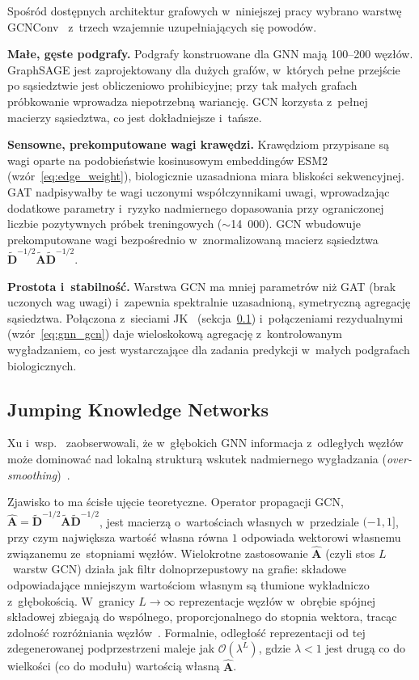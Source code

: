 \documentclass{SGGW-thesis}
\begin{document}
Spośród dostępnych architektur grafowych w~niniejszej pracy wybrano warstwę GCNConv~\cite{kipf2017}
z~trzech wzajemnie uzupełniających się powodów.

\textbf{Małe, gęste podgrafy.} Podgrafy konstruowane dla GNN mają 100--200 węzłów. GraphSAGE
jest zaprojektowany dla dużych grafów, w~których pełne przejście po sąsiedztwie jest
obliczeniowo prohibicyjne; przy tak małych grafach próbkowanie wprowadza niepotrzebną
wariancję. GCN korzysta z~pełnej macierzy sąsiedztwa, co jest dokładniejsze i~tańsze.

\textbf{Sensowne, prekomputowane wagi krawędzi.} Krawędziom przypisane są wagi oparte na
podobieństwie kosinusowym embeddingów ESM2 (wzór~\eqref{eq:edge_weight}), biologicznie
uzasadniona miara bliskości sekwencyjnej. GAT nadpisywałby te wagi uczonymi współczynnikami
uwagi, wprowadzając dodatkowe parametry i~ryzyko nadmiernego dopasowania przy ograniczonej
liczbie pozytywnych próbek treningowych ($\sim$14~000). GCN wbudowuje prekomputowane wagi
bezpośrednio w~znormalizowaną macierz sąsiedztwa $\tilde{\mathbf{D}}^{-1/2}\tilde{\mathbf{A}}\tilde{\mathbf{D}}^{-1/2}$.

\textbf{Prostota i~stabilność.} Warstwa GCN ma mniej parametrów niż GAT (brak uczonych wag
uwagi) i~zapewnia spektralnie uzasadnioną, symetryczną agregację sąsiedztwa. Połączona z~sieciami
JK~\cite{xu2018} (sekcja~\ref{sec:jk}) i~połączeniami rezydualnymi (wzór~\eqref{eq:gnn_gcn})
daje wieloskokową agregację z~kontrolowanym wygładzaniem, co jest wystarczające dla zadania
predykcji w~małych podgrafach biologicznych.

\subsection{Jumping Knowledge Networks}
\label{sec:jk}

Xu i~wsp.~\cite{xu2018} zaobserwowali, że w~głębokich GNN informacja z~odległych węzłów może dominować
nad lokalną strukturą wskutek nadmiernego wygładzania (\textit{over-smoothing})~\cite{oono2020}.

Zjawisko to ma ścisłe ujęcie teoretyczne. Operator propagacji GCN, $\hat{\mathbf{A}} =
\tilde{\mathbf{D}}^{-1/2}\tilde{\mathbf{A}}\tilde{\mathbf{D}}^{-1/2}$, jest macierzą o~wartościach
własnych w~przedziale $(-1, 1]$, przy czym największa wartość własna równa $1$ odpowiada wektorowi
własnemu związanemu ze~stopniami węzłów. Wielokrotne zastosowanie $\hat{\mathbf{A}}$ (czyli stos
$L$~warstw GCN) działa jak filtr dolnoprzepustowy na grafie: składowe odpowiadające mniejszym
wartościom własnym są tłumione wykładniczo z~głębokością. W~granicy $L \to \infty$ reprezentacje
węzłów w~obrębie spójnej składowej zbiegają do wspólnego, proporcjonalnego do stopnia wektora,
tracąc zdolność rozróżniania węzłów~\cite{oono2020}. Formalnie, odległość reprezentacji od tej
zdegenerowanej podprzestrzeni maleje jak $\mathcal{O}(\lambda^L)$, gdzie $\lambda < 1$ jest drugą
co do wielkości (co do modułu) wartością własną $\hat{\mathbf{A}}$.
\end{document}
